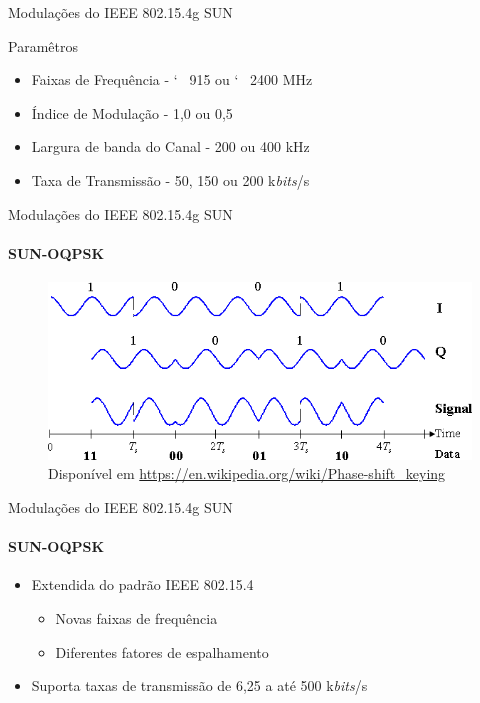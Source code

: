 \documentclass[c]{beamer}
\begin{document}
\begin{darkframes}
\begin{frame}{Modulações do IEEE 802.15.4g SUN}
    \begin{block}{Paramêtros}
      \begin{itemize}
        \item {Faixas de Frequência} - \char`~ 915 ou \char`~ 2400 MHz
        \item {Índice de Modulação} - 1,0 ou 0,5
        \item {Largura de banda do Canal} - 200 ou 400 kHz
        \item {Taxa de Transmissão} - {50}, {150} ou {200} k\emph{bits}/s
      \end{itemize}
    \end{block}
  \end{frame}

  \begin{frame}{Modulações do IEEE 802.15.4g SUN}
    \framesubtitle{SUN-OQPSK}
    \begin{figure}
      \centering
      \includegraphics[width=\textwidth]{resources/OQPSK_timing_diagram.png}\\
      \footnotesize{Disponível em \url{https://en.wikipedia.org/wiki/Phase-shift_keying}}
    \end{figure}
  \end{frame}

  \begin{frame}{Modulações do IEEE 802.15.4g SUN}
    \framesubtitle{SUN-OQPSK}
    \begin{exampleblock}{
        \begin{itemize}
          \item Extendida do padrão IEEE 802.15.4
                \begin{itemize}
                  \item Novas \alert{faixas de frequência}
                  \item Diferentes \alert{fatores de espalhamento}
                \end{itemize}
          \item Suporta \alert{taxas de transmissão} de \alert{6,25} a até \alert{500} k\emph{bits}/s
        \end{itemize}}
    \end{exampleblock}
  \end{frame}


\end{darkframes}
\end{document}
